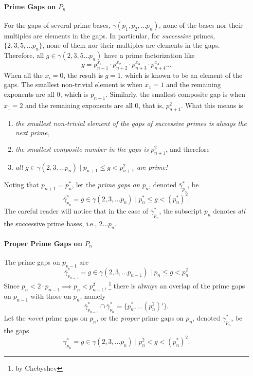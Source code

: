\documentclass{article}
\begin{document}
\paragraph{Prime Gaps on $P_n$}	For the gaps of several prime bases, $\gamma(p_1, p_2, \dots p_n)$, none of the bases nor their multiples are elements in the gaps. In particular, for \emph{successive} primes, $\{ 2, 3, 5, \dots p_n \}$, none of them nor their multiples are elements in the gaps. Therefore, all $g \in \gamma(2, 3, 5 \dots p_n)$ have a prime factorization like
	\begin{equation*}g = p_{n+1}^{x_1} \cdot  p_{n+2}^{x_2} \cdot p_{n+3}^{x_3} \cdot p_{n+4}^{x_4} \ldots \end{equation*}
When all the $x_i = 0$, the result is $g = 1$, which is known to be an element of the gaps. The smallest non-trivial element is when $x_1 = 1$ and the remaining exponents are all $0$, which is $p_{n+1}$. Similarly, the smallest composite gap is when $x_1 = 2$ and the remaining exponents are all $0$, that is, $p_{n+1}^2$. What this means is 
	\begin{enumerate}
 		\item \emph{the smallest non-trivial element of the gaps of successive primes is always the next prime,}
		\item \emph{the smallest composite number in the gaps is} $p_{n+1}^2$, and therefore
		\item \emph{all} $g \in \gamma(2, 3, \dots p_n) \mid p_{n+1} \leq g < p_{n+1}^2$ \emph{are prime!}
	\end{enumerate}
Noting that $p_{n+1} = p_n^*$, let the \emph{prime gaps on $p_n$}, denoted $\bar{\gamma}_{p_n}^*$, be
	\begin{equation*}\bar{\gamma}_{p_n}^* = g \in \gamma(2, 3, \dots p_n) \mid p_n^* \leq g < (p_n^*)^2.\end{equation*}
The careful reader will notice that in the case of $\bar{\gamma}_{p_n}^*$, the subscript $p_n$ denotes \emph{all} the successive prime bases, i.e., $2 \ldots p_n$.
 
\paragraph{Proper Prime Gaps on $P_n$}	The prime gaps on $p_{n-1}$ are 
	\begin{equation*}\bar{\gamma}_{p_{n-1}}^* = g \in \gamma(2, 3, \dots p_{n-1}) \mid p_n \leq g < p_n^2 \end{equation*}
Since $p_n < 2 \cdot p_{n-1} \implies p_n < p_{n-1}^2$, \footnote{by Chebyshev} there is always an overlap of the prime gaps on $p_{n-1}$ with those on $p_n$, namely
	\begin{equation*}\bar{\gamma}_{p_{n-1}}^* \cap \bar{\gamma}_{p_n}^* = \{ p_n^*, \dots (p_n^2)' \}.\end{equation*}
Let the \emph{novel} prime gaps on $p_n$, or the \emph{proper} prime gaps on $p_n$, denoted $\gamma_{p_n}^*$, be the gaps
	\begin{equation*}\gamma_{p_n}^* = g \in \gamma(2, 3, \ldots p_n) \mid p_n^2 < g < (p_n^*)^2.\end{equation*}
\end{document}
